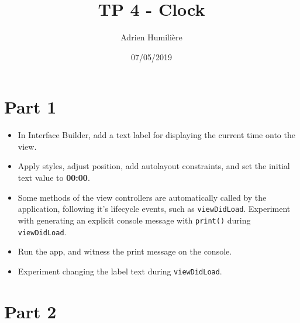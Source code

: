 \documentclass[a4paper,11pt]{scrartcl}
\begin{document}
\newcommand{\mytitle}{TP 4 - Clock}
\title{\mytitle}
\author{Adrien Humilière}
\date{07/05/2019}

\maketitle

\section*{Part 1}

\begin{itemize}
\item In Interface Builder, add a text label for displaying the current time onto the view.
\item Apply styles, adjust position, add autolayout constraints, and set the initial text value to \textbf{00:00}.
\item Some methods of the view controllers are automatically called by the application, following it's lifecycle events, such as \texttt{viewDidLoad}. Experiment with generating an explicit console message with \texttt{print()} during \texttt{viewDidLoad}.
\item Run the app, and witness the print message on the console.
\item Experiment changing the label text during \texttt{viewDidLoad}.
\end{itemize}

\section*{Part 2}
\end{document}
